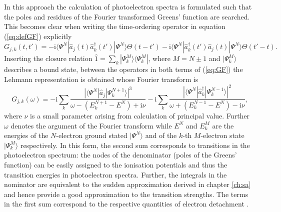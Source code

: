 {In this approach the calculation of photoelectron spectra is formulated such that the poles and residues of the Fourier transformed Greens' function are searched.
This becomes clear when writing the time-ordering operator in equation (\ref{eq:defGF}) explicitly
\begin{equation} \label{eq:GF}
G_{j,k}(t,t')= -\text{i}\langle \Psi^N | \hat{a}_j(t)\hat{a}^\dagger_k(t') |\Psi^N\rangle \Theta(t-t') -
                   \text{i} \langle \Psi^N | \hat{a}^\dagger_k(t')\hat{a}_j(t) |\Psi^N\rangle \Theta(t'-t).
\end{equation}
Inserting the closure relation $\hat{1}=\sum_k |\Psi^M_k\rangle\langle \Psi^M_k |$, where $M=N\pm 1$ and $|\Psi^M_k\rangle$ describes a bound state, between the operators in both terms of (\ref{eq:GF}) the Lehmann representation \cite{bookGF} is obtained whose Fourier transform is
\begin{equation}\label{eq:gfSpect}
G_{j,k}(\omega)=-\text{i} \sum_k\frac{\left|\langle \Psi^N | \hat{a}_j|\Psi^{N+1}_k \rangle \right|^3}{\omega-(E_k^{N+1}-E^N)+\text{i}\nu}-
                \text{i}\sum_k\frac{\left|\langle \Psi^N | \hat{a}^\dagger_k|\Psi^{N-1}_k \rangle \right|^2}{\omega+(E_k^{N-1}-E^N)-\text{i}\nu},
\end{equation}
where $\nu$ is a small parameter arising from calculation of principal value.
Further $\omega$ denotes the argument of the Fourier transform while $E^N$ and $E_k^M$ are the energies of the $N$-electron ground stated $|\Psi^N\rangle$ and of the $k$-th $M$-electron state $|\Psi_k^M\rangle$ respectively.
In this form, the second sum corresponds to transitions in the photoelectron spectrum: the nodes of the denominator (poles of the Greens' function) can be easily assigned to the ionisation potentials and thus the transition energies in photoelectron spectra.
Further, the integrals in the nominator are equivalent to the sudden approximation derived in chapter \ref{ch:sa} and hence provide a good approximation to the transition strengths.
The terms in the first sum correspond to the respective quantities of electron detachment \cite{1pGFcederbaum}.

}
